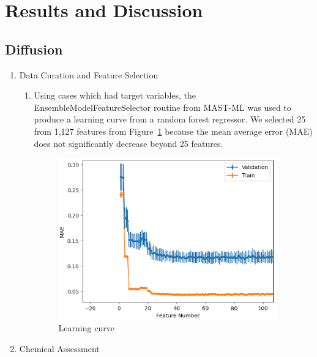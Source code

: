 \section{Results and Discussion}

\subsection{Diffusion}

\begin{enumerate}

    \item Data Curation and Feature Selection
    
    \begin{enumerate}

        \item Using cases which had target variables, the EnsembleModelFeatureSelector routine from MAST-ML was used to produce a learning curve from a random forest regressor. We selected 25 from 1,127 features from Figure~\ref{diffusion_learning_curve} because the mean average error (MAE) does not significantly decrease beyond 25 features.

        \begin{figure}[H]
        \centering
        \includegraphics[width=0.95\textwidth]{figures/diffusion_learning_curve.png}
        \caption{Learning curve}
        \label{diffusion_learning_curve}
        \end{figure}
    
    \end{enumerate}
    
    \item Chemical Assessment


\end{enumerate}
